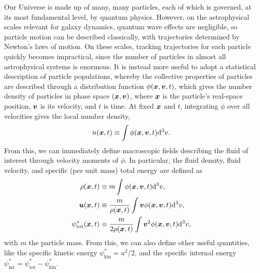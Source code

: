 Our Universe is made up of many, many particles, each of which is governed, at its most fundamental level, by quantum physics. However, on the astrophysical scales relevant for galaxy dynamics, quantum wave effects are negligible, so particle motion can be described classically, with trajectories determined by Newton's laws of motion. On these scales, tracking trajectories for each particle quickly becomes impractical, since the number of particles in almost all astrophysical systems is enormous. It is instead more useful to adopt a statistical description of particle populations, whereby the collective properties of particles are described through a distribution function $\phi(\bm{x}, \bm{v}, t)$, which gives the number density of particles in phase space $(\bm{x}, \bm{v})$, where $\bm{x}$ is the particle's real-space position, $\bm{v}$ is its velocity, and $t$ is time. At fixed $\bm{x}$ and $t$, integrating $\phi$ over all velocities gives the local number density,
\begin{align}
    n(\bm{x}, t)
        \equiv \int \phi(\bm{x}, \bm{v}, t)  \mathrm{d} ^3v .
\end{align}
From this, we can immediately define macroscopic fields describing the fluid of interest through velocity moments of $\phi$. In particular, the fluid density, fluid velocity, and specific (\ie per unit mass) total energy are defined as
\begin{align}
    \rho(\bm{x}, t)
        &\equiv m \int \phi(\bm{x}, \bm{v}, t)  \mathrm{d} ^3v
        , \\
    \bm{u}(\bm{x}, t)
        &\equiv \frac{m}{\rho(\bm{x}, t)} \int \bm{v} \phi(\bm{x}, \bm{v}, t)  \mathrm{d} ^3v
        , \\
    \psi^{*}_\mathrm{tot}(\bm{x}, t)
        &\equiv \frac{m}{2\rho(\bm{x}, t)}\int \bm{v}^{ 2} \phi(\bm{x}, \bm{v}, t)  \mathrm{d} ^3v
        ,
\end{align}
with $m$ the particle mass. From this, we can also define other useful quantities, like the specific kinetic energy $\psi^{*}_\mathrm{kin} = u^2 / 2$, and the specific internal energy $\psi^{*}_\mathrm{int} = \psi^{*}_\mathrm{tot} - \psi^{*}_\mathrm{kin}$.

